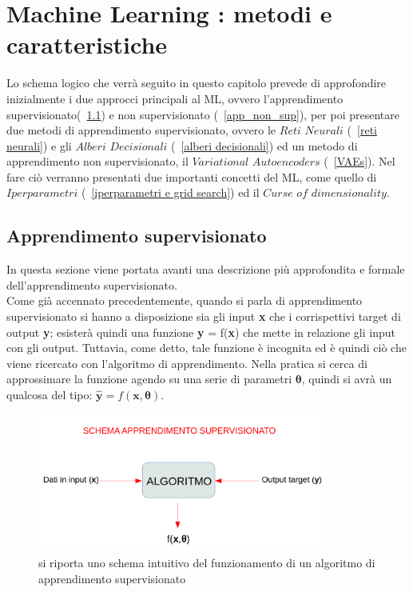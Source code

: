 \section{Machine Learning : metodi e caratteristiche}
\label{ML: metodi e caratteristiche}

Lo schema logico che verrà seguito in questo capitolo prevede di approfondire inizialmente i due approcci principali al ML, ovvero l'apprendimento supervisionato(~\ref{app_sup}) e non supervisionato (~\ref{app_non_sup}), per poi presentare due metodi di apprendimento supervisionato, ovvero le $\textit{Reti Neurali}$ (~\ref{reti neurali}) e gli $\textit{Alberi Decisionali}$ (~\ref{alberi decisionali}) ed un metodo di apprendimento non supervisionato, il $\textit{Variational Autoencoders}$ (~\ref{VAEs}). Nel fare ciò verranno presentati due importanti concetti del ML, come quello di $\textit{Iperparametri}$ (~\ref{iperparametri e grid search}) ed il $\textit{Curse of dimensionality}$.

\subsection{Apprendimento supervisionato}
\label{app_sup}
In questa sezione viene portata avanti una descrizione più approfondita e formale dell'apprendimento supervisionato.\\
Come già accennato precedentemente, quando si parla di apprendimento supervisionato si hanno a disposizione sia gli input \textbf{x} che i corrispettivi target di output \textbf{y}; esisterà quindi una funzione 
\textbf{y} = f(\textbf{x}) che mette in relazione gli input con gli output. Tuttavia, come detto, tale funzione è incognita ed è quindi ciò che viene ricercato con l'algoritmo di apprendimento.
Nella pratica si cerca di approssimare la funzione agendo su una serie di parametri $\bm{\theta}$, quindi si avrà un qualcosa del tipo: $\hat{\textbf{y}} = f(\textbf{x},\bm{\theta})$. \\

\begin{figure}[h!]
	\centering
	\includegraphics[width=0.85\textwidth]{figs/App_sup.png}
	\caption{si riporta uno schema intuitivo del funzionamento di un algoritmo di apprendimento supervisionato}
	\label{fig:schema_app_sup}
\end{figure}


